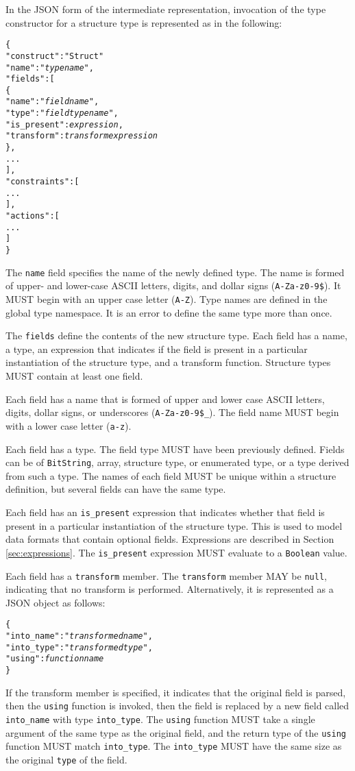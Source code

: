 \documentclass[10pt,twocolumn,a4paper]{article}
\newcommand{\code}[1]{\texttt{#1}}
\begin{document}
In the JSON form of the intermediate representation, invocation of the type
constructor for a structure type is represented as in the following:
\footnotesize
\begin{alltt}
  \{
    "construct"   : "Struct"
    "name"        : "\emph{type name}",
    "fields"      : [
      \{
        "name"       : "\emph{field name}",
        "type"       : "\emph{field type name}",
        "is\_present" : \emph{expression},
        "transform"  : \emph{transform expression}
      \},
      ...
    ],
    "constraints" : [
      ...
    ],
    "actions" : [
      ...
    ]
  \}
\end{alltt}
\normalsize
The \code{name} field specifies the name of the newly defined type. The
name is formed of upper- and lower-case ASCII letters, digits, and dollar
signs (\code{A-Za-z0-9\$}).  It MUST begin with an upper case letter
(\code{A-Z}). Type names are defined in the global type namespace.
It is an error to define the same type more than once.

The \code{fields} define the contents of the new structure type. Each
field has a name, a type, an expression that indicates if the field is
present in a particular instantiation of the structure type, and a
transform function. Structure types MUST contain at least one field.

Each field has a name that is formed of upper and lower case ASCII letters,
digits, dollar signs, or underscores (\code{A-Za-z0-9\$\_}). The field name
MUST begin with a lower case letter (\code{a-z}).

Each field has a type. The field type MUST have been previously defined.
Fields can be of \code{BitString}, array, structure type, or enumerated type,
or a type derived from such a type. The names of each field MUST be unique
within a structure definition, but several fields can have the same type.

Each field has an \code{is\_present} expression that indicates
whether that field is present in a particular instantiation of the
structure type. This is used to model data formats that contain optional
fields. Expressions are described in Section \ref{sec:expressions}. The
\code{is\_present} expression MUST evaluate to a \code{Boolean} value.

Each field has a \code{transform} member.
The \code{transform} member MAY be \code{null}, indicating that no
transform is performed.
Alternatively, it is represented as a JSON object as follows:
\footnotesize
\begin{alltt}
  \{
    "into\_name" : "\emph{transformed name}",
    "into\_type" : "\emph{transformed type}",
    "using"      : \emph{function name}
  \}
\end{alltt}
\normalsize
If the transform member is specified, it indicates that the original
field is parsed, then the \code{using} function is invoked, then the field
is replaced by a new field called \code{into\_name} with type \code{into\_type}.
The \code{using} function MUST take a single argument of the same type as
the original field, and the return type of the \code{using} function MUST
match \code{into\_type}.
The \code{into\_type} MUST have the same size as the original \code{type}
of the field.
\end{document}

